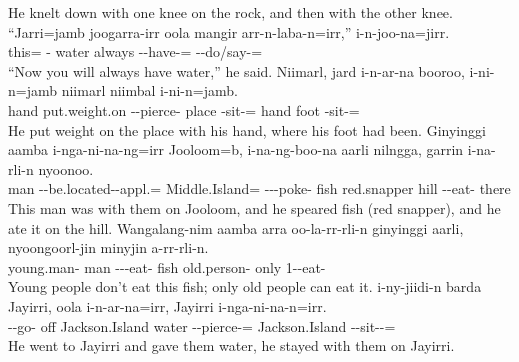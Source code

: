\begin{exye}
\ft He knelt down with one knee on the rock, and then with the other knee.
\exy {}\enlargethispage*{1cm}
\gll ``Jarri=jamb joogarra-irr oola mangir arr-n-laba-n=irr,'' i-n-joo-na=jirr.\\
this= - water always --have-= --do/say-=\\
\ft ``Now you will always have water,'' he said.
\exy {}
\gll Niimarl, jard i-n-ar-na booroo, i-ni-n=jamb niimarl niimbal i-ni-n=jamb.\\
hand put.weight.on --pierce- place -sit-= hand foot -sit-=\\
\ft He put weight on the place with his hand, where his foot had been.
\exy {}
\gll Ginyinggi aamba i-nga-ni-na-ng=irr Jooloom=b, i-na-ng-boo-na aarli nilngga, garrin i-na-rli-n nyoonoo.\\
 man --be.located--appl.= Middle.Island= ---poke- fish red.snapper hill --eat- there\\
\ft This man was with them on Jooloom, and he speared  fish (red snapper), and he ate it on the hill.
\exy {}
\gll Wangalang-nim aamba arra oo-la-rr-rli-n ginyinggi aarli, nyoongoorl-jin minyjin a-rr-rli-n.\\
young.man- man  ---eat-  fish old.person- only 1--eat-\\
\ft Young people don't eat this fish; only old people can eat it.
\exy {}
\gll i-ny-jiidi-n barda Jayirri, oola i-n-ar-na=irr, Jayirri i-nga-ni-na-n=irr.\\
--go- off Jackson.Island water --pierce-= Jackson.Island --sit--=\\
\ft He went to Jayirri and gave them water, he stayed with them on Jayirri.
\exy {}

\end{exye}
